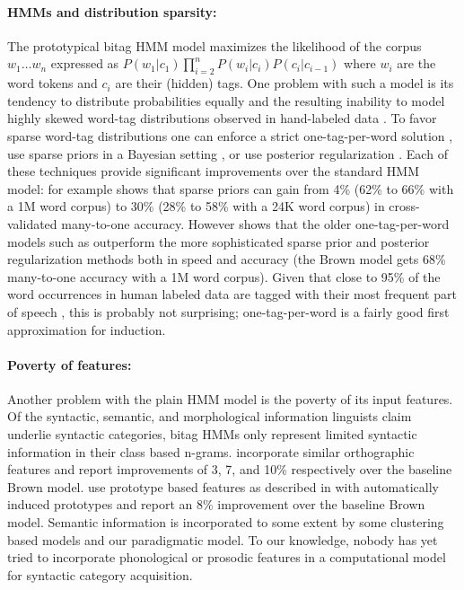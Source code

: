 \paragraph{HMMs and distribution sparsity:}
The prototypical bitag HMM model maximizes the likelihood of the
corpus $w_1 \ldots w_n$ expressed as $P(w_1|c_1)\prod_{i=2}^n
P(w_i|c_i) P(c_i|c_{i-1})$ where $w_i$ are the word tokens and $c_i$
are their (hidden) tags.  One problem with such a model is its
tendency to distribute probabilities equally and the resulting
inability to model highly skewed word-tag distributions observed in
hand-labeled data \cite{johnson:2007:EMNLP-CoNLL2007}.  To favor
sparse word-tag distributions one can enforce a strict
one-tag-per-word solution
\cite{Brown:1992:CNG:176313.176316,Clark:2003:CDM:1067807.1067817},
use sparse priors in a Bayesian setting
\cite{goldwater-griffiths:2007:ACLMain,johnson:2007:EMNLP-CoNLL2007},
or use posterior regularization
\cite{Ganchev:2010:PRS:1859890.1859918}.  Each of these techniques
provide significant improvements over the standard HMM model: for
example \cite{Gao:2008:CBE:1613715.1613761} shows that sparse priors
can gain from 4\% (62\% to 66\% with a 1M word corpus) to 30\% (28\%
to 58\% with a 24K word corpus) in cross-validated many-to-one
accuracy.  However \cite{Christodoulopoulos:2010:TDU:1870658.1870714}
shows that the older one-tag-per-word models such as
\cite{Brown:1992:CNG:176313.176316} outperform the more sophisticated
sparse prior and posterior regularization methods both in speed and
accuracy (the Brown model gets 68\% many-to-one accuracy with a 1M
word corpus).  Given that close to 95\% of the word occurrences in
human labeled data are tagged with their most frequent part of speech
\cite{Lee:2010:STU:1870658.1870741}, this is probably not surprising;
one-tag-per-word is a fairly good first approximation for induction.

\paragraph{Poverty of features:}
Another problem with the plain HMM model is the poverty of its input
features.  Of the syntactic, semantic, and morphological information
linguists claim underlie syntactic categories, bitag HMMs only
represent limited syntactic information in their class based n-grams.
\cite{Clark:2003:CDM:1067807.1067817,bergkirkpatrick-klein:2010:ACL,blunsom-cohn:2011:ACL-HLT2011}
incorporate similar orthographic features and report improvements of
3, 7, and 10\% respectively over the baseline Brown model.
\cite{Christodoulopoulos:2010:TDU:1870658.1870714} use prototype based
features as described in \cite{Haghighi:2006:PLS:1220835.1220876} with
automatically induced prototypes and report an 8\% improvement over
the baseline Brown model.  Semantic information is incorporated to
some extent by some clustering based models and our paradigmatic
model.  To our knowledge, nobody has yet tried to incorporate
phonological or prosodic features in a computational model for
syntactic category acquisition.

